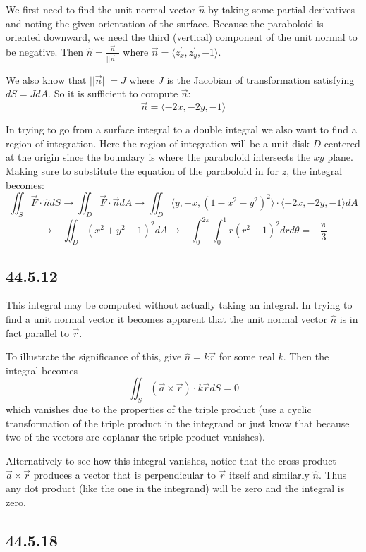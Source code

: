 \documentclass{article}
\begin{document}
We first need to find the unit normal vector $\hat{n}$ by taking some partial derivatives and noting the given orientation of the surface. Because the paraboloid is oriented downward, we need the third (vertical) component of the unit normal to be negative. Then $\hat{n} = \frac{\vec{n}}{||\vec{n}||}$ where $\vec{n} = \langle z^{\prime}_x, z^{\prime}_y ,-1 \rangle$.

We also know that $||\vec{n}|| = J$ where $J$ is the Jacobian of transformation satisfying $dS = JdA$. So it is sufficient to compute $\vec{n}$:
$$\vec{n} = \langle -2x, -2y ,-1 \rangle$$

In trying to go from a surface integral to a double integral we also want to find a region of integration. Here the region of integration will be a unit disk $D$ centered at the origin since the boundary is where the paraboloid intersects the $xy$ plane. Making sure to substitute the equation of the paraboloid in for $z$, the integral becomes:
$$\iint_S \vec{F}\cdot \hat{n}dS\to \iint_D \vec{F}\cdot \vec{n}dA \to \iint_D \langle y, -x, (1-x^2-y^2)^2 \rangle\cdot \langle -2x, -2y ,-1 \rangle dA$$
$$\to -\iint_D (x^2+y^2-1)^2dA \to -\int_0^{2\pi}\int_0^1 r(r^2-1)^2drd\theta = -\frac{\pi}{3}$$

\subsection{44.5.12}

This integral may be computed without actually taking an integral. In trying to find a unit normal vector it becomes apparent that the unit normal vector $\hat{n}$ is in fact parallel to $\vec{r}$. 

To illustrate the significance of this, give $\hat{n} = k\vec{r}$ for some real $k$. Then the integral becomes $$\iint_S (\vec{a}\times \vec{r})\cdot k\vec{r} dS = 0$$ which vanishes due to the properties of the triple product (use a cyclic transformation of the triple product in the integrand or just know that because two of the vectors are coplanar the triple product vanishes).

Alternatively to see how this integral vanishes, notice that the cross product $\vec{a}\times \vec{r}$ produces a vector that is perpendicular to $\vec{r}$ itself and similarly $\hat{n}$. Thus any dot product (like the one in the integrand) will be zero and the integral is zero.

\subsection{44.5.18}
\end{document}
